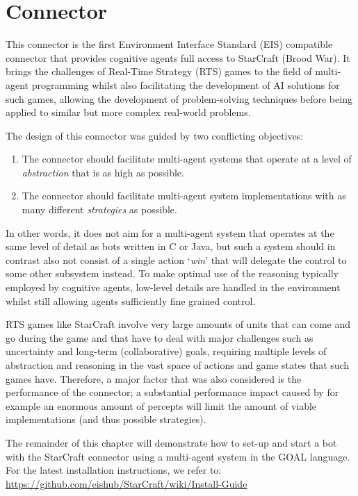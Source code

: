 \chapter{Connector}
This connector is the first Environment Interface Standard (EIS) compatible connector that provides cognitive agents full access to StarCraft (Brood War). It brings the challenges of Real-Time Strategy (RTS) games to the field of multi-agent programming whilst also facilitating the development of AI solutions for such games, allowing the development of problem-solving techniques before being applied to similar but more complex real-world problems.

The design of this connector was guided by two conflicting objectives:
\begin{enumerate}
 \item The connector should facilitate multi-agent systems that operate at a level of \textit{abstraction} that is as high as possible.
 \item The connector should facilitate multi-agent system implementations with as many different \textit{strategies} as possible.
\end{enumerate}
In other words, it does not aim for a multi-agent system that operates at the same level of detail as bots written in C or Java, but such a system should in contrast also not consist of a single action `\textit{win}' that will delegate the control to some other subsystem instead. To make optimal use of the reasoning typically employed by cognitive agents, low-level details are handled in the environment whilst still allowing agents sufficiently fine grained control.

RTS games like StarCraft involve very large amounts of units that can come and go during the game and that have to deal with major challenges such as uncertainty and long-term (collaborative) goals, requiring multiple levels of abstraction and reasoning in the vast space of actions and game states that such games have. Therefore, a major factor that was also considered is the performance of the connector; a substantial performance impact caused by for example an enormous amount of percepts will limit the amount of viable implementations (and thus possible strategies).

The remainder of this chapter will demonstrate how to set-up and start a bot with the StarCraft connector using a multi-agent system in the GOAL language. For the latest installation instructions, we refer to: \\ \url{https://github.com/eishub/StarCraft/wiki/Install-Guide}

